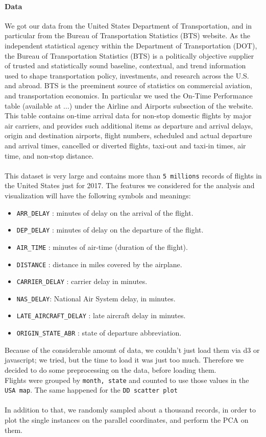 \documentclass[a4paper, 12pt]{article}
\begin{document}
\paragraph*{Data}
We got our data from the United States Department of Transportation, and in particular from the 
Bureau of Transportation Statistics (BTS) website. As the independent statistical agency within the
Department of Transportation (DOT), the Bureau of Transportation Statistics (BTS) is a politically
objective supplier of trusted and statistically sound baseline, contextual, and trend information used
to shape transportation policy, investments, and research across the U.S. and abroad. BTS is the
preeminent source of statistics on commercial aviation, and transportation economics.
In particular we used the On-Time Performance table (available at ...) under the Airline and Airports
subsection of the website. This table contains on-time arrival data for non-stop domestic flights by
major air carriers, and provides such additional items as departure and arrival delays, origin and
destination airports, flight numbers, scheduled and actual departure and arrival times, cancelled or
diverted flights, taxi-out and taxi-in times, air time, and non-stop distance.
\\
\\
This dataset is very large and contains more than \texttt{5 millions} records of flights in the United
States just for 2017. 
The features we considered for the analysis and visualization will have the following symbols and
meanings:
\begin{itemize}
	\item \texttt{ARR\_DELAY} : minutes of delay on the arrival of the flight.
	\item \texttt{DEP\_DELAY} : minutes of delay on the departure of the flight.
	\item \texttt{AIR\_TIME} : minutes of air-time (duration of the flight).
\item \texttt{DISTANCE} : distance in miles covered by the airplane.
\item \texttt{CARRIER\_DELAY} : carrier delay in minutes.
\item \texttt{NAS\_DELAY}: National Air System delay, in minutes.
\item \texttt{LATE\_AIRCRAFT\_DELAY} : late aircraft delay in minutes.
\item \texttt{ORIGIN\_STATE\_ABR} : state of departure abbreviation.
\end{itemize}
Because of the considerable amount of data, we couldn't just load them via d3 or javascript; 
we tried, but the time to load it was just too much. Therefore we decided to do some preprocessing on
the data, before loading them.\\
Flights were grouped by \texttt{month, state} and counted to use those values in the \texttt{USA map}.
The same happened for the \texttt{DD scatter plot}\\ \\
In addition to that, we randomly sampled about a thousand records, in order to plot the single instances
on the parallel coordinates, and perform the PCA on them.
\end{document}
